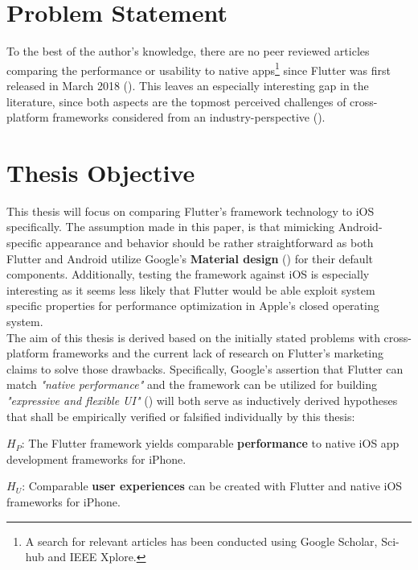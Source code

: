 \section{Problem Statement}
To the best of the author's knowledge, there are no peer reviewed articles comparing the performance or usability to native apps\footnote{A search for relevant articles has been conducted using Google Scholar, Sci-hub and IEEE Xplore.} since Flutter was first released in March 2018 (\cite{FlutterReleases2020}).
This leaves an especially interesting gap in the literature, since both aspects are the topmost perceived challenges of cross-platform frameworks considered from an industry-perspective (\cite{BioernHansen2019}).

\section{Thesis Objective} \label{section::thesis_objective}
This thesis will focus on comparing Flutter's framework technology to iOS specifically. The assumption made in this paper, is that mimicking Android-specific appearance and behavior should be rather straightforward as 
both Flutter and Android utilize Google's \textbf{Material design} (\cite{Google2021}) for their default components.
Additionally, testing the framework against iOS is especially interesting as it seems less likely that Flutter would be 
able exploit system specific properties for performance optimization in Apple's closed operating system.\\
The aim of this thesis is derived based on the initially stated problems with cross-platform frameworks and the current lack of research on Flutter's marketing claims to solve those drawbacks.
Specifically, Google's assertion that Flutter can match \textit{"native performance"} and the framework can be utilized for building \textit{"expressive and flexible UI"} (\cite{FlutterDev20})
will both serve as inductively derived hypotheses that shall be empirically verified or falsified individually by this thesis:

\textbf{$H_P$}: The Flutter framework yields comparable \textbf{performance} to native iOS  app development frameworks for iPhone.

\textbf{$H_U$}: Comparable \textbf{user experiences} can be created with Flutter and native iOS frameworks for iPhone.

